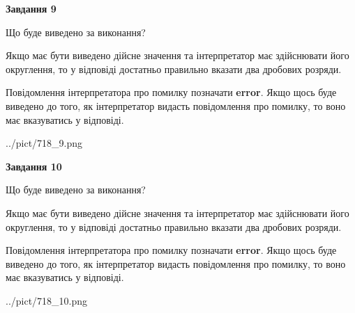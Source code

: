 \documentclass[12pt, ukrainian]{article}
\begin{document}
{\begin {Large}
{\begin {center}\textbf{Завдання 9}\end {center}}\par
Що буде виведено за виконання? \par

Якщо має бути виведено дійсне значення та інтерпретатор має здійснювати його округлення, 
то у відповіді достатньо правильно вказати два дробових розряди.

Повідомлення інтерпретатора про помилку позначати \textbf{error}.
Якщо щось буде виведено до того, як інтерпретатор видасть повідомлення про помилку, 
то воно має вказуватись у відповіді. \par

\begin{center}
	{../pict/718_9.png}
\end{center}
\newpage

{\begin {center}\textbf{Завдання 10}\end {center}}\par
Що буде виведено за виконання? \par

Якщо має бути виведено дійсне значення та інтерпретатор має здійснювати його округлення, 
то у відповіді достатньо правильно вказати два дробових розряди.

Повідомлення інтерпретатора про помилку позначати \textbf{error}.
Якщо щось буде виведено до того, як інтерпретатор видасть повідомлення про помилку, 
то воно має вказуватись у відповіді. \par

\begin{center}
	{../pict/718_10.png}
\end{center}
\newpage

\end {Large}}
\end{document}
